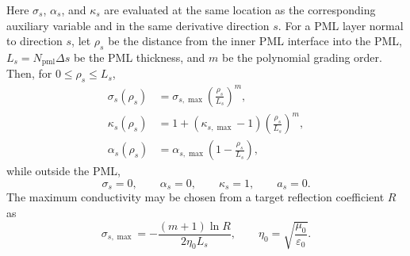 \documentclass{article}
\numberwithin{equation}{section}
\numberwithin{figure}{section}
\begin{document}
Here $\sigma_s$, $\alpha_s$, and $\kappa_s$ are evaluated at the same location as the corresponding auxiliary variable and in the same derivative direction $s$. For a PML layer normal to direction $s$, let $\rho_s$ be the distance from the inner PML interface into the PML, $L_s=N_{\mathrm{pml}}\Delta s$ be the PML thickness, and $m$ be the polynomial grading order. Then, for $0\le \rho_s\le L_s$,
\begin{align}
    \sigma_s(\rho_s) & = \sigma_{s,\max}\left(\frac{\rho_s}{L_s}\right)^m,                  \\
    \kappa_s(\rho_s) & = 1+\left(\kappa_{s,\max}-1\right)\left(\frac{\rho_s}{L_s}\right)^m, \\
    \alpha_s(\rho_s) & = \alpha_{s,\max}\left(1-\frac{\rho_s}{L_s}\right),
\end{align}
while outside the PML,
\begin{equation}
    \sigma_s=0, \qquad \alpha_s=0, \qquad \kappa_s=1, \qquad a_s=0.
\end{equation}
The maximum conductivity may be chosen from a target reflection coefficient $R$ as
\begin{equation}
    \sigma_{s,\max}
    =
    -\frac{(m+1)\ln R}{2\eta_0 L_s},
    \qquad
    \eta_0=\sqrt{\frac{\mu_0}{\varepsilon_0}}.
\end{equation}
\end{document}
